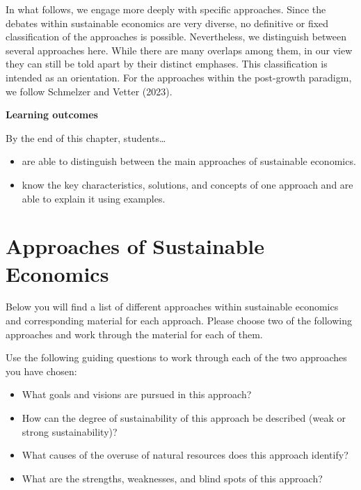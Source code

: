 \documentclass[
  british,
  a4paper,
  DIV=11,
  numbers=noendperiod,
  oneside,
  openany]{scrreprt}
\providecommand{\tightlist}{%
  \setlength{\itemsep}{0pt}\setlength{\parskip}{0pt}}
\begin{document}
In what follows, we engage more deeply with specific approaches. Since
the debates within sustainable economics are very diverse, no definitive
or fixed classification of the approaches is possible. Nevertheless, we
distinguish between several approaches here. While there are many
overlaps among them, in our view they can still be told apart by their
distinct emphases. This classification is intended as an orientation.
For the approaches within the post-growth paradigm, we follow Schmelzer
and Vetter (2023).

\textbf{Learning outcomes}

By the end of this chapter, students\ldots{}

\begin{itemize}
\tightlist
\item
  are able to distinguish between the main approaches of sustainable
  economics.
\item
  know the key characteristics, solutions, and concepts of one approach
  and are able to explain it using examples.
\end{itemize}

\section{Approaches of Sustainable
Economics}\label{approaches-of-sustainable-economics}

\begin{tcolorbox}[enhanced jigsaw, arc=.35mm, bottomrule=.15mm, bottomtitle=1mm, breakable, colback=white, colbacktitle=quarto-callout-caution-color!10!white, colframe=quarto-callout-caution-color-frame, coltitle=black, left=2mm, leftrule=.75mm, opacityback=0, opacitybacktitle=0.6, rightrule=.15mm, title={Exercise -- Approaches of sustainable economics}, titlerule=0mm, toprule=.15mm, toptitle=1mm]

Below you will find a list of different approaches within sustainable
economics and corresponding material for each approach. Please choose
two of the following approaches and work through the material for each
of them.

Use the following guiding questions to work through each of the two
approaches you have chosen:

\begin{itemize}
\tightlist
\item
  What goals and visions are pursued in this approach?
\item
  How can the degree of sustainability of this approach be described
  (weak or strong sustainability)?
\item
  What causes of the overuse of natural resources does this approach
  identify?
\item
  What are the strengths, weaknesses, and blind spots of this approach?
\end{itemize}

\end{tcolorbox}
\end{document}
